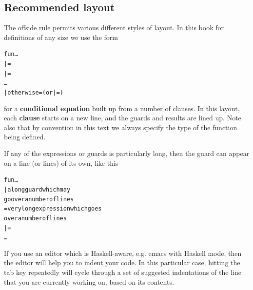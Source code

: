 \begin{figure}
\end{figure}

\subsection*{Recommended layout}

The offside rule permits various different styles of layout. In this book 
for definitions of any size we use the form 
\begin{alltt}
fun \vone \vtwo \ldots \vn
  | \gone          = \eone     
  | \gtwo          = \etwo   
  \ldots
  | otherwise   = \er       ({\rm or}    | \gr      = \er)
\end{alltt}
for a \textbf{conditional equation} built up
from a number of clauses.
In this layout, each \textbf{clause} starts on a new line, and the guards and results
are lined up. Note also that by convention in this text we always specify the type
of the function being defined.

If any of
the expressions \texttt{\ei} or guards \texttt{\gi} is particularly long, then the
guard can appear on a line (or lines) of its own, like this
\begin{alltt}
fun \vone \vtwo \ldots \vn
  | a long guard which may
    go over a number of lines 
       = very long expression which goes 
         over a number of lines
  | \gtwo       = \etwo         
  \ldots
\end{alltt}
If you use an editor which is Haskell-aware, e.g. emacs with Haskell mode, then the editor will help you to indent your code. In this particular case, hitting the tab key repeatedly will cycle through a set of suggested indentations of the line that you are currently working on, based on its contents.



